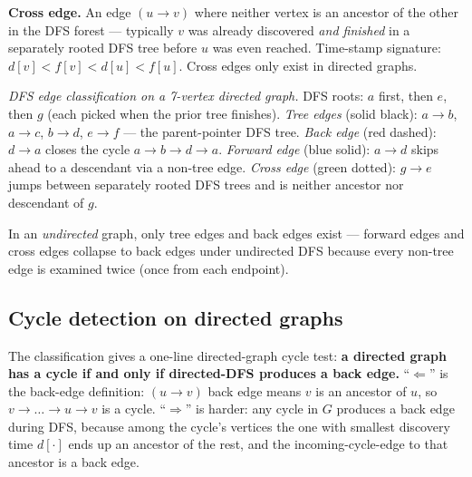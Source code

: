 \documentclass[11pt]{article}
\begin{document}
\begin{defnbox}
\textbf{Cross edge.} An edge $(u \to v)$ where neither vertex is an
ancestor of the other in the DFS forest --- typically $v$ was
already discovered \emph{and finished} in a separately rooted DFS
tree before $u$ was even reached. Time-stamp signature:
$d[v] < f[v] < d[u] < f[u]$.
Cross edges only exist in directed graphs.
\end{defnbox}

\begin{center}
\end{center}

\emph{DFS edge classification on a 7-vertex directed graph.}
DFS roots: $a$ first, then $e$, then $g$ (each picked when the
prior tree finishes). \emph{Tree edges} (solid black):
$a{\to}b$, $a{\to}c$, $b{\to}d$, $e{\to}f$ --- the parent-pointer
DFS tree. \emph{Back edge} (red dashed):
$d{\to}a$ closes the cycle $a{\to}b{\to}d{\to}a$.
\emph{Forward edge} (blue solid):
$a{\to}d$ skips ahead to a descendant via a non-tree edge.
\emph{Cross edge} (green dotted):
$g{\to}e$ jumps between separately rooted DFS trees and is
neither ancestor nor descendant of $g$.

In an \emph{undirected} graph, only tree edges and back edges
exist --- forward edges and cross edges collapse to back edges
under undirected DFS because every non-tree edge is examined
twice (once from each endpoint).

\subsection*{Cycle detection on directed graphs}

The classification gives a one-line directed-graph cycle test:
\textbf{a directed graph has a cycle if and only if directed-DFS
produces a back edge.} ``$\Leftarrow$'' is the back-edge
definition: $(u \to v)$ back edge means $v$ is an ancestor of
$u$, so $v \to \ldots \to u \to v$ is a cycle. ``$\Rightarrow$''
is harder: any cycle in $G$ produces a back edge during DFS,
because among the cycle's vertices the one with smallest discovery
time $d[\cdot]$ ends up an ancestor of the rest, and the
incoming-cycle-edge to that ancestor is a back edge.
\end{document}
